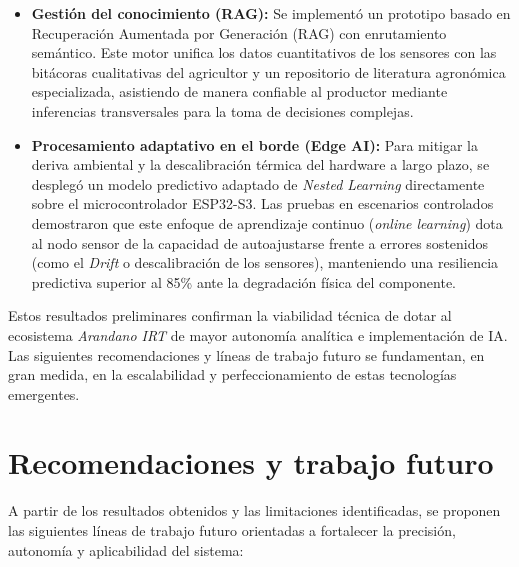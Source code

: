 \begin{itemize}
    \item \textbf{Gestión del conocimiento (RAG):} Se implementó un prototipo basado en Recuperación Aumentada por Generación (RAG) con enrutamiento semántico. Este motor unifica los datos cuantitativos de los sensores con las bitácoras cualitativas del agricultor y un repositorio de literatura agronómica especializada, asistiendo de manera confiable al productor mediante inferencias transversales para la toma de decisiones complejas.
    \item \textbf{Procesamiento adaptativo en el borde (Edge AI):} Para mitigar la deriva ambiental y la descalibración térmica del hardware a largo plazo, se desplegó un modelo predictivo adaptado de \textit{Nested Learning} directamente sobre el microcontrolador ESP32-S3. Las pruebas en escenarios controlados demostraron que este enfoque de aprendizaje continuo (\textit{online learning}) dota al nodo sensor de la capacidad de autoajustarse frente a errores sostenidos (como el \textit{Drift} o descalibración de los sensores), manteniendo una resiliencia predictiva superior al 85\% ante la degradación física del componente.
\end{itemize}

Estos resultados preliminares confirman la viabilidad técnica de dotar al ecosistema \textit{Arandano IRT} de mayor autonomía analítica e implementación de IA. Las siguientes recomendaciones y líneas de trabajo futuro se fundamentan, en gran medida, en la escalabilidad y perfeccionamiento de estas tecnologías emergentes.

\section{Recomendaciones y trabajo futuro}
\label{sec:recomendaciones_futuro}

A partir de los resultados obtenidos y las limitaciones identificadas, se proponen las siguientes líneas de trabajo futuro orientadas a fortalecer la precisión, autonomía y aplicabilidad del sistema:

